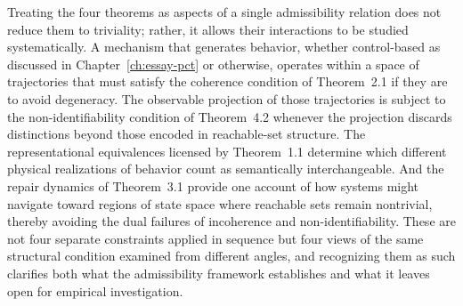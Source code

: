 Treating the four theorems as aspects of a single admissibility relation does not reduce them to triviality; rather, it allows their interactions to be studied systematically. A mechanism that generates behavior, whether control-based as discussed in Chapter~\ref{ch:essay-pct} or otherwise, operates within a space of trajectories that must satisfy the coherence condition of Theorem~2.1 if they are to avoid degeneracy. The observable projection of those trajectories is subject to the non-identifiability condition of Theorem~4.2 whenever the projection discards distinctions beyond those encoded in reachable-set structure. The representational equivalences licensed by Theorem~1.1 determine which different physical realizations of behavior count as semantically interchangeable. And the repair dynamics of Theorem~3.1 provide one account of how systems might navigate toward regions of state space where reachable sets remain nontrivial, thereby avoiding the dual failures of incoherence and non-identifiability. These are not four separate constraints applied in sequence but four views of the same structural condition examined from different angles, and recognizing them as such clarifies both what the admissibility framework establishes and what it leaves open for empirical investigation.
